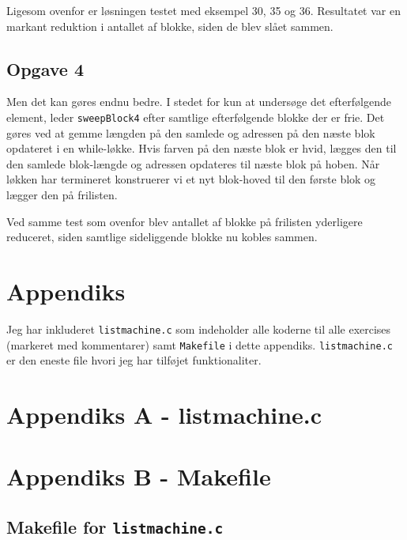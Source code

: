 \documentclass{article}
\begin{document}
Ligesom ovenfor er løsningen testet med eksempel 30, 35 og 36. Resultatet var en markant reduktion i antallet af blokke, siden de blev slået sammen.

\subsection*{Opgave 4}
Men det kan gøres endnu bedre. I stedet for kun at undersøge det efterfølgende element, leder \texttt{sweepBlock4} efter samtlige efterfølgende blokke der er frie. Det gøres ved at gemme længden på den samlede og adressen på den næste blok opdateret i en while-løkke. Hvis farven på den næste blok er hvid, lægges den til den samlede blok-længde og adressen opdateres til næste blok på hoben. Når løkken har termineret konstruerer vi et nyt blok-hoved til den første blok og lægger den på frilisten.

Ved samme test som ovenfor blev antallet af blokke på frilisten yderligere reduceret, siden samtlige sideliggende blokke nu kobles sammen.



\newpage

\section*{Appendiks}
Jeg har inkluderet \texttt{listmachine.c} som indeholder alle koderne til alle exercises (markeret med kommentarer) samt \texttt{Makefile} i dette appendiks. \texttt{listmachine.c} er den eneste file hvori jeg har tilføjet funktionaliter.

\label{listmachine}
\section*{Appendiks A - listmachine.c}


\newpage 

\section*{Appendiks B - Makefile}
\subsection*{Makefile for \texttt{listmachine.c}}


\label{lastPage}
\end{document}

